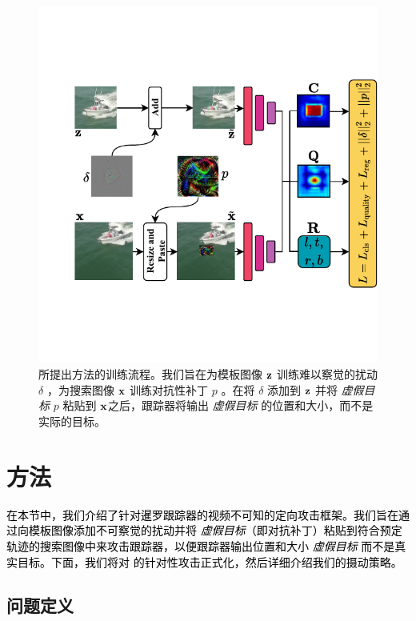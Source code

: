 \begin{figure}[t]
\centering
\includegraphics[width=1.0\textwidth]{Img/attack/network_v5.pdf}
\caption{所提出方法的训练流程。我们旨在为模板图像 $\textbf z$ 训练难以察觉的扰动 $\delta$ ，为搜索图像 $\textbf x$ 训练对抗性补丁 $p$ 。在将 $\delta$ 添加到 $\textbf z$ 并将 \textit{虚假目标} $p$ 粘贴到 $\textbf x$之后，跟踪器将输出 \textit{虚假目标} 的位置和大小，而不是实际的目标。}
\label{fig:net}
\end{figure}

\section{方法}

\textcolor{black}{在本节中，我们介绍了针对暹罗跟踪器的视频不可知的定向攻击框架。我们旨在通过向模板图像添加不可察觉的扰动并将 \textit{虚假目标}（即对抗补丁）粘贴到符合预定轨迹的搜索图像中来攻击跟踪器，以便跟踪器输出位置和大小 \textit{虚假目标} 而不是真实目标。下面，我们将对 \cite{SiamFC++} 的针对性攻击正式化，然后详细介绍我们的摄动策略。}
 
\subsection{问题定义}

